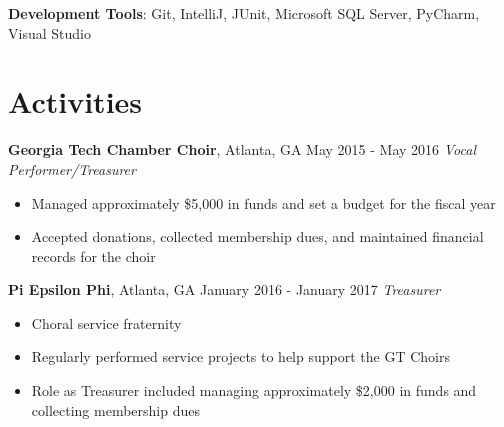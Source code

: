 \documentclass[10pt]{article}
\begin{document}
\textbf{Development Tools}: Git, IntelliJ, JUnit, Microsoft SQL Server, PyCharm, Visual Studio

\section*{Activities}
\textbf{Georgia Tech Chamber Choir}, Atlanta, GA \hfill May 2015 - May 2016
\linebreak
\textit{Vocal Performer/Treasurer}
\begin{itemize}
    \item Managed approximately \$5,000 in funds and set a budget for the fiscal year
    \item Accepted donations, collected membership dues, and maintained financial records for the choir
\end{itemize}

\vspace{3pt}

\textbf{Pi Epsilon Phi}, Atlanta, GA \hfill January 2016 - January 2017
\linebreak
\textit{Treasurer}
\begin{itemize}
    \item Choral service fraternity
    \item Regularly performed service projects to help support the GT Choirs
    \item Role as Treasurer included managing approximately \$2,000 in funds and collecting membership dues
\end{itemize}
\end{document}
